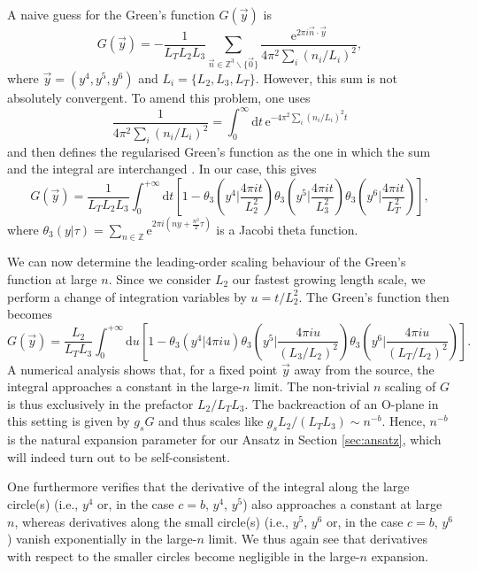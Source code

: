 \documentclass[11pt]{article}
\newcommand{\be}{\begin{equation}}
\newcommand{\ee}{\end{equation}}
\def\be{\begin{equation}}
\def\ee{\end{equation}}
\renewcommand{\[}{\left[}
\renewcommand{\]}{\right]}
\renewcommand{\(}{\left(}
\renewcommand{\)}{\right)}
\renewcommand{\d}{\textrm{d}}
\newcommand{\e}{\textrm{e}}
\newcommand{\dd}{\mathrm{d}}
\newcommand{\<}{\langle}
\renewcommand{\>}{\rangle}
\begin{document}
A naive guess for the Green's function $G(\vec y)$ is
\begin{equation}
    G(\vec y) =  - \frac{1}{L_T L_2 L_3} \sum_{\vec{n} \in \mathbb{Z}^3\backslash\{\vec{0}\}} \frac{\e^{2\pi i \vec{n} \cdot \vec y}}{4 \pi^2 \sum_i (n_i/L_i)^2},
\end{equation}
where $\vec{y}=(y^4,y^5,y^6)$ and $L_i =\{L_2, L_3, L_T\}$. However, this sum is not absolutely convergent. To amend this problem, one uses
\begin{equation}
    \frac{1}{4\pi^2 \sum_i (n_i/L_i)^2 } = \int_0^\infty \d t \,\e^{-4 \pi^2 \sum_i (n_i/L_i)^2 t}
\end{equation}
and then defines the regularised Green's function as the one in which the sum and the integral are interchanged \cite{Shandera:2003gx}. In our case, this gives
\be
    G(\vec{y}) = \frac{1}{L_T L_2 L_3} \int_0^{+\infty} \dd t \left[1 - \theta_3\left(y^4\bigg| \frac{4 \pi it}{L_2^2}\right)\theta_3\left(y^5\bigg| \frac{4 \pi it}{L_3^2}\right)\theta_3\left(y^6\bigg| \frac{4 \pi it}{L_T^2}\right) \right] ,
\ee
where $\theta_3 (y|\tau) = \sum_{n \in \mathbb{Z}} \e^{2 \pi i (n y + \frac{n^2}{2}\tau)}$ is a Jacobi theta function.

We can now determine the leading-order scaling behaviour of the Green's function at large $n$. Since we consider $L_2$ our fastest growing length scale, we perform a change of integration variables by $ u = t/L_2^2 $. The Green's function then becomes
\be
    G(\vec{y}) = \frac{L_2}{L_T L_3} \int_0^{+\infty} \dd u \left[1 - \theta_3\left(y^4\bigg| 4 \pi i u\right)\theta_3\left(y^5\bigg| \frac{4 \pi i u}{(L_3/L_2)^2}\right)\theta_3\left(y^6\bigg| \frac{4 \pi i u}{(L_T/L_2)^2}\right) \right] .
\ee
A numerical analysis shows that, for a fixed point $\vec{y}$ away from the source, the integral approaches a constant in the large-$n$ limit. The non-trivial $n$ scaling of $G$ is thus exclusively in the prefactor $L_2/L_TL_3$. The backreaction of an O-plane in this setting is given by $g_s G$  \cite{Blaback:2010sj} and thus scales like $g_s L_2/(L_T L_3) \sim n^{-b}$. Hence, $n^{-b}$ is the natural expansion parameter for our Ansatz in Section \ref{sec:ansatz}, which will indeed turn out to be self-consistent.

One furthermore verifies that the derivative of the integral along the large circle(s) (i.e., $y^4$ or, in the case $c=b$, $y^4$, $y^5$) also approaches a constant at large $n$, whereas derivatives along the small circle(s) (i.e., $y^5$, $y^6$ or, in the case $c=b$, $y^6$) vanish exponentially in the large-$n$ limit.
We thus again see that derivatives with respect to the smaller circles become negligible in the large-$n$ expansion.
\end{document}
